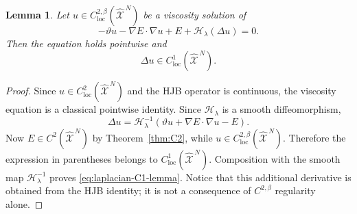 \documentclass[11pt]{article}
\def\Xc{{\mathcal X}}
\def\hX{\widehat{\Xc}^{\,N}}
\newtheorem{lemma}[theorem]{Lemma}
\theoremstyle{definition}
\theoremstyle{remark}
\numberwithin{equation}{section}
\begin{document}
\begin{lemma}\label{lem:laplacian-C1}
Let $u\in C_{\mathrm{loc}}^{2,\beta}(\hX)$ be a viscosity solution of
\[
 -\vartheta u-\nabla E\cdot\nabla u+E+\mathscr H_\lambda(\Delta u)=0.
\]
Then the equation holds pointwise and
\begin{equation}\label{eq:laplacian-C1-lemma}
 \Delta u\in C_{\mathrm{loc}}^1(\hX).
\end{equation}
\end{lemma}
\begin{proof}
Since $u\in C_{\mathrm{loc}}^2(\hX)$ and the HJB operator is continuous, the viscosity equation is
a classical pointwise identity.  Since $\mathscr H_\lambda$ is a smooth diffeomorphism,
\begin{equation}\label{eq:laplacian-inversion-detailed}
 \Delta u
 =\mathscr H_\lambda^{-1}
 \left(\vartheta u+\nabla E\cdot\nabla u-E\right).
\end{equation}
Now $E\in C^2(\hX)$ by Theorem~\ref{thm:C2}, while
$u\in C_{\mathrm{loc}}^{2,\beta}(\hX)$.  Therefore the expression in parentheses belongs to
$C_{\mathrm{loc}}^1(\hX)$.  Composition with the smooth map
$\mathscr H_\lambda^{-1}$ proves \eqref{eq:laplacian-C1-lemma}.  Notice that this additional
derivative is obtained from the HJB identity; it is not a consequence of
$C^{2,\beta}$ regularity alone.
\end{proof}
\end{document}
